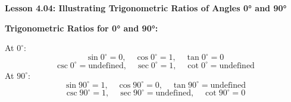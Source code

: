 \begin{center}
\textbf{Lesson 4.04: Illustrating Trigonometric Ratios of Angles 0° and 90°}
\end{center}

\vspace*{-1.5ex}

\noindent \textbf{Trigonometric Ratios for 0° and 90°:}

\noindent  At \( 0^\circ \):
        \[
        \sin 0^\circ = 0, \quad \cos 0^\circ = 1, \quad \tan 0^\circ = 0
        \]
        \[
        \csc 0^\circ = \text{undefined}, \quad \sec 0^\circ = 1, \quad \cot 0^\circ = \text{undefined}
        \]
\noindent At \( 90^\circ \):
        \[
        \sin 90^\circ = 1, \quad \cos 90^\circ = 0, \quad \tan 90^\circ = \text{undefined}
        \]
        \[
        \csc 90^\circ = 1, \quad \sec 90^\circ = \text{undefined}, \quad \cot 90^\circ = 0
        \]
  
